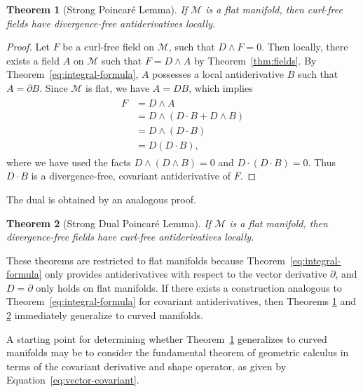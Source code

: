 \documentclass[twocolumn,notitlepage,nofootinbib,tightenlines]{revtex4-1}
\newtheorem{thm}{Theorem}[section]
\theoremstyle{definition}
\theoremstyle{remark}
\numberwithin{equation}{section}
\begin{document}
%
\begin{thm}[Strong Poincar\'e Lemma]\label{thm:strong}
    If $\mathcal{M}$ is a flat manifold, then curl-free fields have divergence-free antiderivatives locally.
\end{thm}
%
\begin{proof}
    Let $F$ be a curl-free field on $\mathcal{M}$, such that $D \wedge F = 0$. Then locally, there exists a field $A$ on $\mathcal{M}$ such that $F = D \wedge A$ by Theorem~\ref{thm:fields}. By Theorem~\ref{eq:integral-formula}, $A$ possesses a local antiderivative $B$ such that $A = \partial B$. Since $\mathcal{M}$ is flat, we have $A = D B$, which implies
%
    \begin{align}
        \begin{split}
            F &= D \wedge A \\
              &= D \wedge (D \cdot B + D \wedge B) \\
              &= D \wedge (D \cdot B) \\
              &= D (D \cdot B),
        \end{split}
    \end{align}
%
    where we have used the facts $D \wedge (D \wedge B) = 0$ and $D \cdot (D \cdot B) = 0$. Thus $D \cdot B$ is a divergence-free, covariant antiderivative of $F$.
\end{proof}
%
\noindent
The dual is obtained by an analogous proof.
%
\begin{thm}[Strong Dual Poincar\'e Lemma]\label{thm:dual-strong}
    If $\mathcal{M}$ is a flat manifold, then divergence-free fields have curl-free antiderivatives locally.
\end{thm}
%
These theorems are restricted to flat manifolds because Theorem~\ref{eq:integral-formula} only provides antiderivatives with respect to the vector derivative $\partial$, and $D = \partial$ only holds on flat manifolds. If there exists a construction analogous to Theorem~\ref{eq:integral-formula} for covariant antiderivatives, then Theorems \ref{thm:strong} and \ref{thm:dual-strong} immediately generalize to curved manifolds.

A starting point for determining whether Theorem~\ref{thm:strong} generalizes to curved manifolds may be to consider the fundamental theorem of geometric calculus \cite{hestenes, doran} in terms of the covariant derivative and shape operator, as given by Equation~\ref{eq:vector-covariant}.
\end{document}
